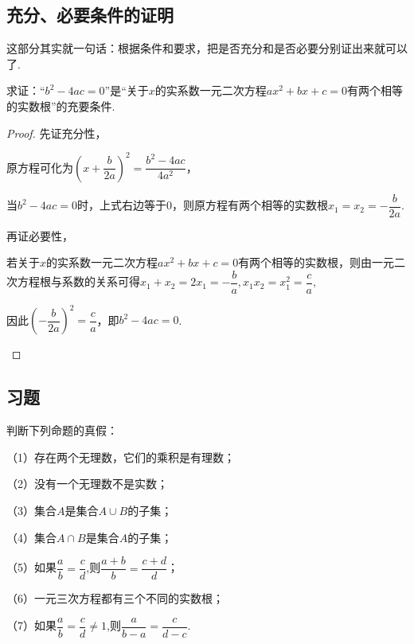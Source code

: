 \documentclass[lang=cn,math=cm,chinesefont=nofont,11pt,scheme=chinese,twocol]{elegantbook}
\begin{document}
\subsection{充分、必要条件的证明}

这部分其实就一句话：根据条件和要求，把是否充分和是否必要分别证出来就可以了.

\begin{example}\label{HS2FZ_lkb1_P26.1}
  求证：“$b^2-4ac=0$”是“关于$x$的实系数一元二次方程$ax^2+bx+c=0$有两个相等的实数根”的充要条件.
\end{example}

\begin{proof}
  先证充分性，

  原方程可化为$\left(x+\dfrac{b}{2a}\right)^{2}=\dfrac{b^{2}-4ac}{4a^{2}}$，

  当$b^2-4ac=0$时，上式右边等于0，则原方程有两个相等的实数根$x_1=x_2=-\dfrac{b}{2a}$.

  再证必要性，
  
\begin{spacing}{1.8}
  若关于$x$的实系数一元二次方程$ax^2+bx+c=0$有两个相等的实数根，则由一元二次方程根与系数的关系可得$x_{1}+x_{2}=2x_{1}=-\dfrac{b}{a},x_{1}x_{2}=x_{1}^{2}=\dfrac{c}{a},$

  因此$\left(-\dfrac{b}{2a}\right)^{2}=\dfrac{c}{a}$，即$b^2-4ac=0$.
\end{spacing}

\end{proof}

\subsection{习题}

\begin{exercise}\label{2017RJB_bx1_P26}
  判断下列命题的真假：

  （1）存在两个无理数，它们的乘积是有理数；

  （2）没有一个无理数不是实数；

  （3）集合$A$是集合$A\cup B$的子集；

  （4）集合$A\cap B$是集合$A$的子集；

\begin{spacing}{2.0}
    （5）如果$\dfrac ab=\dfrac cd$,则$\dfrac{a+b}b=\dfrac{c+d}{d}$；

  （6）一元三次方程都有三个不同的实数根；
  
  （7）如果$\dfrac ab=\dfrac cd\neq 1$,则$\dfrac a{b-a}=\dfrac c{d-c}$.
\end{spacing}

\end{exercise}
\end{document}
